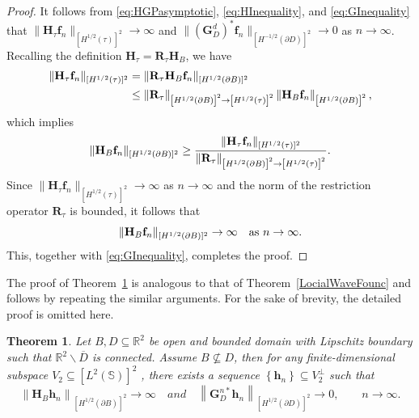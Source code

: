 \documentclass[11pt,reqno,twoside]{amsart}
\newtheorem{thm}{Theorem}[section]
\theoremstyle{definition}
\theoremstyle{remark}
\numberwithin{equation}{section}
\begin{document}
\begin{proof}
It follows from \eqref{eq:HGPasymptotic}, \eqref{eq:HInequality}, and \eqref{eq:GInequality} that 
$\|\mathbf{H}_{\tau} \mathbf{f}_n\|_{[H^{1/2}(\tau)]^2} \to \infty$ and 
$\|(\mathbf{G}_D^d)^* \mathbf{f}_n\|_{[H^{-1/2}(\partial D)]^2} \to 0$ as $n \to \infty$. 
Recalling the definition $\mathbf{H}_{\tau} = \mathbf{R}_{\tau} \mathbf{H}_B$, we have
\begin{equation}\notag
\begin{aligned}
\|\mathbf{H}_{\tau} \mathbf{f}_n\|_{[H^{1/2}(\tau)]^2} 
&= \|\mathbf{R}_{\tau} \mathbf{H}_B \mathbf{f}_n\|_{[H^{1/2}(\partial B)]^2} \\
& \leq \left\|\mathbf R_{\tau}\right\|_{\left[H^{1/2}\left(\partial B \right) \right]^2 \to \left[H^{1/2}\left(\tau \right) \right]^2 } \left\| \mathbf H_{B} \mathbf f_n \right\|_{\left[H^{1/2}\left(\partial B \right) \right]^2 },
\end{aligned}
\end{equation}
which implies
\begin{equation}\notag 
\|\mathbf{H}_B \mathbf{f}_n\|_{[H^{1/2}(\partial B)]^2} 
\geq \frac{\|\mathbf{H}_{\tau} \mathbf{f}_n\|_{[H^{1/2}(\tau)]^2}}{\left\|\mathbf R_{\tau}\right\|_{\left[H^{1/2}\left(\partial B \right) \right]^2 \to \left[H^{1/2}\left(\tau \right) \right]^2 }}.
\end{equation}
Since $\|\mathbf{H}_{\tau} \mathbf{f}_n\|_{[H^{1/2}(\tau)]^2} \to \infty$ as $n \to \infty$ and the norm of the restriction operator $\mathbf{R}_{\tau}$ is bounded, it follows that
\begin{equation}\notag
\|\mathbf{H}_B \mathbf{f}_n\|_{[H^{1/2}(\partial B)]^2} \to \infty \quad \text{as } n \to \infty.
\end{equation}
This, together with \eqref{eq:GInequality}, completes the proof.

\end{proof}

The proof of Theorem~\ref{LocialWaveFounc2} is analogous to that of Theorem~\ref{LocialWaveFounc} and follows by repeating the similar arguments. For the sake of brevity, the detailed proof is omitted here.
\begin{thm}\label{LocialWaveFounc2}
	Let $B, D  \subseteq \mathbb R^2$ be open and bounded domain with Lipschitz boundary such that $\mathbb R^2 \backslash \overline {D}$ is connected. Assume $B \nsubseteq D$, then for any finite-dimensional subspace $V_2 \subseteq \left[L^{2}\left(\mathbb S\right) \right] ^2 $ , there exists a sequence $\left\lbrace  \mathbf h_n \right\rbrace  \subseteq  V_2^{\perp} $ such that
	$$
	\left\|\mathbf H_B \mathbf h_n\right\|_{\left[H^{1/2}\left(\partial B\right) \right] ^2 } \to \infty \quad and \quad \left\| \mathbf G_D^{n*} \mathbf h_n\right\|_{\left[H^{1/2}\left(\partial D\right) \right] ^2 } \to 0, \qquad n\to \infty.
	$$
\end{thm}
\end{document}
